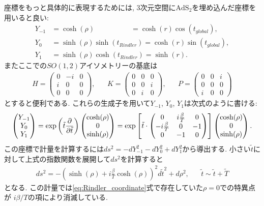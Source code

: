 座標をもっと具体的に表現するためには, 3次元空間に$\mathrm{AdS}_2$を埋め込んだ座標を用いると良い:
\begin{align}
	Y_{-1} &= \cosh(\rho) \hspace{61pt} = \cosh(r)\cos(t_{global}),\nonumber\\
	Y_0    &= \sinh(\rho)\sinh(t_{Rindler}) = \cosh(r)\sin(t_{global}),\\
	Y_1    &= \sinh(\rho)\cosh(t_{Rindler}) = \sinh(r)\nonumber.
\end{align}
またここでの$SO(1,2)$アイソメトリーの基底は
\begin{align}
	H = \begin{pmatrix}
		0 & -i & 0\\
		i & 0 & 0\\
		0 & 0 & 0
	\end{pmatrix},\hspace{20pt}
	K = \begin{pmatrix}
		0 & 0 & 0\\
		0 & 0 & i\\
		0 & i & 0
	\end{pmatrix},\hspace{20pt}
	P = \begin{pmatrix}
		0 & 0 & i\\
		0 & 0 & 0\\
		i & 0 & 0
	\end{pmatrix}
\end{align}
とすると便利である. 
これらの生成子を用いて$Y_{-1}$, $Y_0$, $Y_1$は次式のように書ける:
\begin{align}
	\begin{pmatrix} Y_{-1} \\ Y_0 \\ Y_1 \end{pmatrix}
	= \exp\left(\tilde{t}\frac{\partial}{\partial \tilde{t}}\right)\begin{pmatrix} \cosh(\rho) \\ 0 \\ \sinh(\rho) \end{pmatrix}
	= \exp\left[
		\tilde{t}\cdot\begin{pmatrix}
			0 & i\frac{\beta}{T} & 0\\
			-i\frac{\beta}{T} & 0 & -1\\
			0 & -1 & 0
		\end{pmatrix}
	\right]\begin{pmatrix} \cosh(\rho) \\ 0 \\ \sinh(\rho) \end{pmatrix}.
\end{align}
この座標で計量を計算するには$ds^2 = -dY_{-1}^2 - dY_0^2 + dY_1^2$から導出する. 
小さい$\tilde{t}$に対して上式の指数関数を展開して$ds^2$を計算すると
\begin{align}
	ds^2
	= -\left(\sinh(\rho) + i\frac{\beta}{T}\cosh(\rho)\right)^2d\tilde{t}^2
		+ d\rho^2,\hspace{20pt}\tilde{t}\sim\tilde{t} + \tilde{T}
	\label{eq:embedded_metric}
\end{align}
となる. 
この計量では\eqref{eq:Rindler_coordinate}式で存在していた$\rho=0$での特異点が
$i\beta / T$の項により消滅している. 

